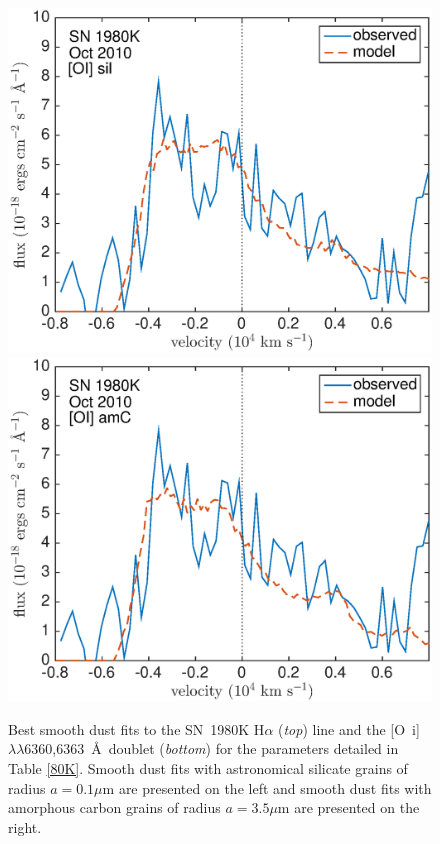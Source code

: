 {\begin{figure}[!t]
\includegraphics[scale=0.4,clip=true, trim=20 0 40 20]{chapters/chapter6/figs/80K/smooth/OI}
\includegraphics[scale=0.4,clip=true, trim=20 0 40 20]{chapters/chapter6/figs/80K/smooth/OI_amC}
\caption{Best smooth dust fits to the SN~1980K H$\alpha$ ({\em top}) line and the  [O~{\sc i}]$\lambda\lambda$6360,6363~\AA\ doublet ({\em bottom}) for the parameters detailed in Table \ref{80K}.  Smooth dust fits with astronomical silicate grains of radius $a=0.1 \mu$m are presented on the left and smooth dust fits with amorphous carbon grains of radius $a=3.5 \mu$m are presented on the right.}
\label{80K_smooth}
\end{figure}

}


